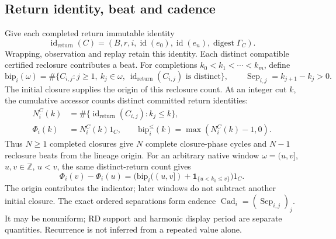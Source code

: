 \subsection{Return identity, beat and cadence}
Give each completed return immutable identity
\begin{equation}
\operatorname{id}_{\mathrm{return}}(C)=
(B,r,i,\operatorname{id}(e_0),\operatorname{id}(e_n),
\operatorname{digest}\Gamma_C).
\label{eq:return-identity}
\end{equation}
Wrapping, observation and replay retain this identity. Each distinct compatible
certified reclosure contributes a beat. For completions
\(k_0<k_1<\cdots<k_m\), define
\begin{equation}
\mathrm{bip}_i(\omega)=
\#\{C_{i,j}:j\ge1,\ k_j\in\omega,\ \operatorname{id}_{\mathrm{return}}(C_{i,j})
\text{ is distinct}\},\qquad
\operatorname{Sep}_{i,j}=k_{j+1}-k_j>0.
\label{eq:beat-reclosure}
\end{equation}
The initial closure supplies the origin of this reclosure count. At an integer
cut \(k\), the cumulative accessor counts distinct committed return identities:
\begin{equation}
\begin{aligned}
N_i^C(k)&=\#\{\operatorname{id}_{\mathrm{return}}(C_{i,j}):k_j\le k\},\\
\Phi_i(k)&=N_i^C(k)1_C,\qquad
\mathrm{bip}^{\le}_i(k)=\max(N_i^C(k)-1,0).
\end{aligned}
\label{eq:cumulative-closure-counts}
\end{equation}
Thus \(N\ge1\) completed closures give \(N\) complete closure-phase cycles and \(N-1\)
reclosure beats from the lineage origin. For an arbitrary native window
\(\omega=(u,v]\), \(u,v\in\mathbb Z\), \(u<v\), the same distinct-return count gives
\begin{equation}
\Phi_i(v)-\Phi_i(u)=
\bigl(\mathrm{bip}_i((u,v])+\mathbf1_{\{u<k_0\le v\}}\bigr)1_C.
\label{eq:closure-phase-window}
\end{equation}
The origin contributes the indicator; later windows do not subtract another
initial closure. The exact ordered separations form cadence \(\operatorname{Cad}_i=(\operatorname{Sep}_{i,j})_j\).
It may be nonuniform; RD support and harmonic display period are separate
quantities. Recurrence is not inferred from a repeated value alone.

